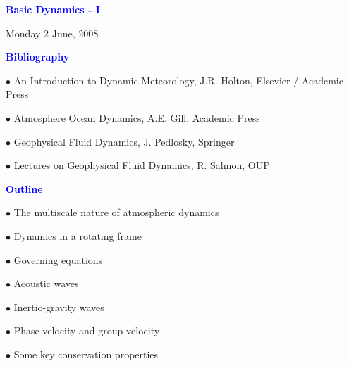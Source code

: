 \documentclass[a4]{seminar}
\newcommand{\B}[1]{\textcolor{blue}{#1}}
\begin{document}

\pagestyle{fancy}



\begin{slide}

\begin{center}

{\Large \bf
\B{Basic Dynamics - I}
}

\end{center}

\vspace{6mm}

\begin{center}
{\small Monday 2 June, 2008}
\end{center}

\end{slide}


\begin{slide}

\B{\bf Bibliography}

\vspace{6mm}

\(\bullet\) An Introduction to Dynamic Meteorology, J.R. Holton,
Elsevier / Academic Press

\(\bullet\) Atmosphere Ocean Dynamics, A.E. Gill, Academic Press

\(\bullet\) Geophysical Fluid Dynamics, J. Pedlosky, Springer

\(\bullet\) Lectures on Geophysical Fluid Dynamics, R. Salmon, OUP


\end{slide}


\begin{slide}


\B{\bf Outline}

\vspace{4mm}

\(\bullet\) The multiscale nature of atmospheric dynamics

\(\bullet\) Dynamics in a rotating frame

\(\bullet\) Governing equations

\vspace{4mm}

\(\bullet\) Acoustic waves

\(\bullet\) Inertio-gravity waves

\(\bullet\) Phase velocity and group velocity

\vspace{4mm}

\(\bullet\) Some key conservation properties


\end{slide}
\end{document}

